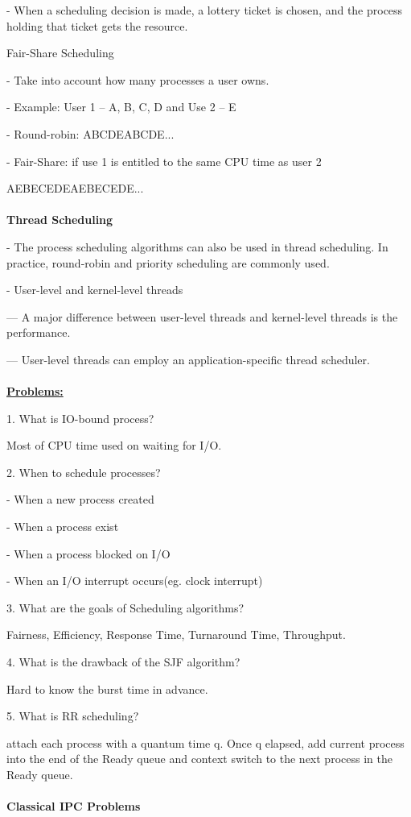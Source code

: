 \documentclass[]{report}
\begin{document}
- When a scheduling decision is made, a lottery ticket is
chosen, and the process holding that ticket gets the resource.

Fair-Share Scheduling

- Take into account how many processes a user owns.

- Example: User 1 – A, B, C, D and Use 2 – E

- Round-robin: ABCDEABCDE...

- Fair-Share: if use 1 is entitled to the same CPU time as user
2

AEBECEDEAEBECEDE...\\\\
\textbf{Thread Scheduling}

- The process scheduling algorithms can also be used
in thread scheduling. In practice, round-robin and
priority scheduling are commonly used.

- User-level and kernel-level threads

--- A major difference between user-level threads and kernel-level
threads is the performance.

--- User-level threads can employ an application-specific thread
scheduler.\\\\
\textbf{\underline{Problems:}}

1. What is IO-bound process?
 
Most of CPU time used on waiting for I/O.

2. When to schedule processes?

- When a new process created

- When a process exist

- When a process blocked on I/O

- When an I/O interrupt occurs(eg. clock interrupt)

3. What are the goals of Scheduling algorithms?

Fairness, Efficiency, Response Time, Turnaround Time, Throughput.

4. What is the drawback of the SJF algorithm?

Hard to know the burst time in advance.

5. What is RR scheduling?

attach each process with a quantum time q. Once q elapsed, add current process into the end of the Ready queue and context switch to the next process in the Ready queue.\\\\
\textbf{Classical IPC Problems}
\end{document}
